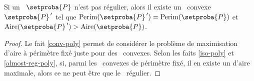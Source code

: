 %
%
%
%
%	










\begin{fact} \label{nece-cond}
	Si un \ngone\ $\setproba{P}$ n'est pas régulier,
	alors il existe un \ngone\ convexe $\setproba{P}^{\,\prime}$ tel que
	$\perim{\setproba{P}^{\,\prime}} = \perim{\setproba{P}}$
	et
	$\area{\setproba{P}^{\,\prime}} > \area{\setproba{P}}$.
\end{fact}


\begin{proof}
	Le fait \ref{conv-poly} permet de considérer le problème de maximisation d'aire à périmètre fixé juste pour des \ngones\ convexes.
	Selon les faits \ref{iso-poly} et \ref{almost-reg-poly}, si, parmi les \ngones\ convexes de périmètre fixé, il en existe un d'aire maximale, alors ce ne peut être que le \ngone\ régulier.
\end{proof}
